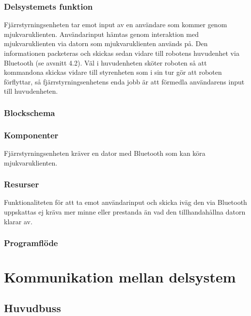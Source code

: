 \documentclass{article}
\begin{document}
\subsubsection{Delsystemets funktion}
Fjärrstyrningsenheten tar emot input av en användare som kommer genom mjukvaruklienten. Användarinput hämtas genom interaktion med mjukvaruklienten via datorn som mjukvaruklienten används på. Den informationen packeteras och skickas sedan vidare till robotens huvudenhet via Bluetooth (se avsnitt 4.2). Väl i huvudenheten sköter roboten så att kommandona skickas vidare till styrenheten som i sin tur gör att roboten förflyttar, så fjärrstyrningsenhetens enda jobb är att förmedla användarens input till huvudenheten.


\subsubsection{Blockschema}

\subsubsection{Komponenter}
Fjärrstyrningsenheten kräver en dator med Bluetooth som kan köra mjukvaruklienten.

\subsubsection{Resurser}
Funktionaliteten för att ta emot användarinput och skicka iväg den via Bluetooth uppskattas ej kräva mer minne eller prestanda än vad den tillhandahållna datorn klarar av.

\subsubsection{Programflöde}

\clearpage

\section{Kommunikation mellan delsystem}

\subsection{Huvudbuss}
\end{document}
